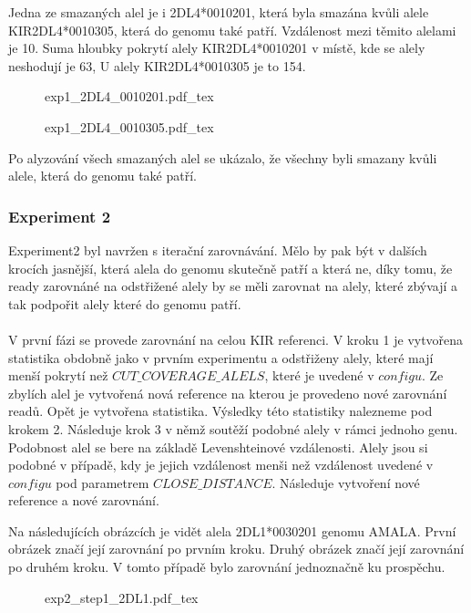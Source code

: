 \documentclass[czech,DP]{thesiskiv}
\numberwithin{equation}{section}
\begin{document}
\noindent
Jedna ze smazaných alel je i 2DL4*0010201, která byla smazána kvůli alele KIR2DL4*0010305, která do genomu také patří. Vzdálenost mezi těmito alelami je 10. Suma hloubky pokrytí alely KIR2DL4*0010201 v místě, kde se alely neshodují je 63, U alely KIR2DL4*0010305 je to 154. 


\begin{figure}[H]
	\centering
    \def\svgwidth{\columnwidth}
    {exp1_2DL4_0010201.pdf_tex} 
\end{figure}

\begin{figure}[H]
	\centering
    \def\svgwidth{\columnwidth}
    {exp1_2DL4_0010305.pdf_tex} 
\end{figure}

\noindent
Po alyzování všech smazaných alel se ukázalo, že všechny byli smazany kvůli alele, která do genomu také patří.

\subsubsection{Experiment 2}
Experiment2 byl navržen s iterační zarovnávání. Mělo by pak být v dalších krocích jasnější, která alela do genomu skutečně patří a která ne, díky tomu, že ready zarovnáné na odstřižené alely by se měli zarovnat na alely, které zbývají a tak podpořit alely které do genomu patří. 
\\
\\
V první fázi se provede zarovnání na celou KIR referenci. V kroku 1 je vytvořena statistika obdobně jako v prvním experimentu a odstřiženy alely, které mají menší pokrytí než $CUT\_COVERAGE\_ALELS$, které je uvedené v $configu$. Ze zbylích alel je vytvořená nová reference na kterou je provedeno nové zarovnání readů. Opět je vytvořena statistika. Výsledky této statistiky nalezneme pod krokem 2. Následuje krok 3 v němž soutěží podobné alely v rámci jednoho genu. Podobnost alel se bere na základě Levenshteinové vzdálenosti. Alely jsou si podobné v případě, kdy je jejich vzdálenost menši než vzdálenost uvedené v $configu$ pod parametrem $CLOSE\_DISTANCE$. Následuje vytvoření nové reference a nové zarovnání.  


\noindent
Na následujících obrázcích je vidět alela 2DL1*0030201 genomu AMALA. První obrázek značí její zarovnání po prvním kroku. Druhý obrázek značí její zarovnání po druhém kroku. V tomto případě bylo zarovnání jednoznačně ku prospěchu.

\begin{figure}[H]
	\centering
    \def\svgwidth{\columnwidth}
    {exp2_step1_2DL1.pdf_tex} 
\end{figure}
\end{document}
